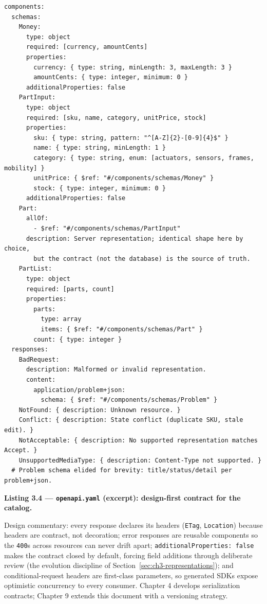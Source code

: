\begin{verbatim}
components:
  schemas:
    Money:
      type: object
      required: [currency, amountCents]
      properties:
        currency: { type: string, minLength: 3, maxLength: 3 }
        amountCents: { type: integer, minimum: 0 }
      additionalProperties: false
    PartInput:
      type: object
      required: [sku, name, category, unitPrice, stock]
      properties:
        sku: { type: string, pattern: "^[A-Z]{2}-[0-9]{4}$" }
        name: { type: string, minLength: 1 }
        category: { type: string, enum: [actuators, sensors, frames, mobility] }
        unitPrice: { $ref: "#/components/schemas/Money" }
        stock: { type: integer, minimum: 0 }
      additionalProperties: false
    Part:
      allOf:
        - $ref: "#/components/schemas/PartInput"
      description: Server representation; identical shape here by choice,
        but the contract (not the database) is the source of truth.
    PartList:
      type: object
      required: [parts, count]
      properties:
        parts:
          type: array
          items: { $ref: "#/components/schemas/Part" }
        count: { type: integer }
  responses:
    BadRequest:
      description: Malformed or invalid representation.
      content:
        application/problem+json:
          schema: { $ref: "#/components/schemas/Problem" }
    NotFound: { description: Unknown resource. }
    Conflict: { description: State conflict (duplicate SKU, stale edit). }
    NotAcceptable: { description: No supported representation matches Accept. }
    UnsupportedMediaType: { description: Content-Type not supported. }
  # Problem schema elided for brevity: title/status/detail per problem+json.
\end{verbatim}

\noindent\textbf{Listing 3.4 --- \texttt{openapi.yaml} (excerpt): design-first
contract for the catalog.}\label{lst:ch3-openapi}

Design commentary: every response declares its headers (\texttt{ETag},
\texttt{Location}) because headers are contract, not decoration; error responses
are reusable components so the \texttt{400}s across resources can never drift
apart; \texttt{additionalProperties: false} makes the contract closed by default,
forcing field additions through deliberate review (the evolution discipline of
Section~\ref{sec:ch3-representations}); and conditional-request headers are
first-class parameters, so generated SDKs expose optimistic concurrency to every
consumer. Chapter 4 develops serialization contracts; Chapter 9 extends this
document with a versioning strategy.

